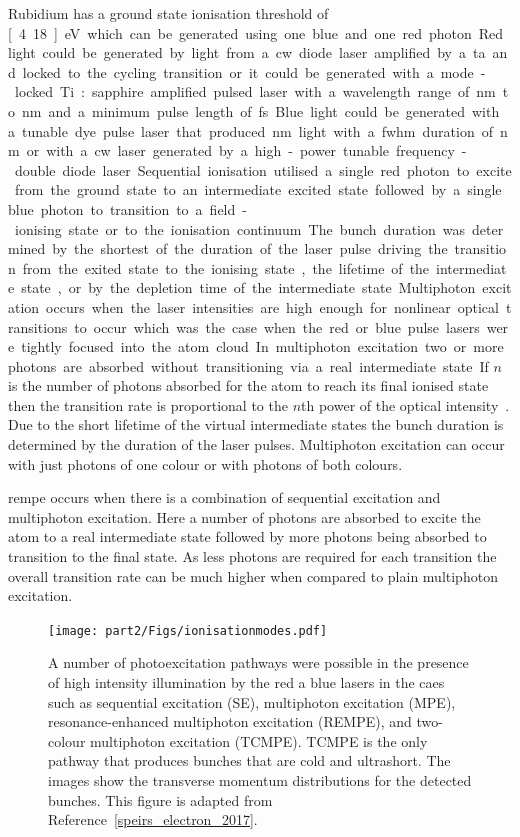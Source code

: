 Rubidium has a ground state ionisation threshold of \unit[4.18]{eV} which can be generated using one blue and one red photon.
Red light could be generated by light from a \gls{cw} diode laser amplified by a \gls{ta} and locked to the cycling transition or it could be generated with a mode-locked Ti:sapphire amplified pulsed laser with a wavelength range of \unit[770]{nm} to \unit[830]{nm} and a minimum pulse length of \unit[35]{fs}.
Blue light could be generated with a tunable dye pulse laser that produced \unit[460 to 490]{nm} light with a \gls{fwhm} duration of \unit[5]{nm} or with a \gls{cw} laser generated by a high-power tunable frequency-double diode laser.

Sequential ionisation utilised a single red photon to excite from the ground state to an intermediate excited state followed by a single blue photon to transition to a field-ionising state or to the ionisation continuum.
The bunch duration was determined by the shortest of the duration of the laser pulse driving the transition from the exited state to the ionising state, the lifetime of the intermediate state, or by the depletion time of the intermediate state.

Multiphoton excitation occurs when the laser intensities are high enough for nonlinear optical transitions to occur which was the case when the red or blue pulse lasers were tightly focused into the atom cloud.
In multiphoton excitation two or more photons are absorbed without transitioning via a real intermediate state.
If $n$ is the number of photons absorbed for the atom to reach its final ionised state then the transition rate is proportional to the $n$th power of the optical intensity~\cite{joachain_atoms_2011}.
Due to the short lifetime of the virtual intermediate states the bunch duration is determined by the duration of the laser pulses.
Multiphoton excitation can occur with just photons of one colour or with photons of both colours.

\Gls{rempe} occurs when there is a combination of sequential excitation and multiphoton excitation.
Here a number of photons are absorbed to excite the atom to a real intermediate state followed by more photons being absorbed to transition to the final state.
As less photons are required for each transition the overall transition rate can be much higher when compared to plain multiphoton excitation.

\begin{figure}
    \center
    \texttt{[image: part2/Figs/ionisationmodes.pdf]}
    \caption[Photoexcitation pathways.]{A number of photoexcitation pathways were possible in the presence of high intensity illumination by the red a blue lasers in the \gls{caes} such as sequential excitation (SE), multiphoton excitation (MPE), resonance-enhanced multiphoton excitation (REMPE), and two-colour multiphoton excitation (TCMPE). TCMPE is the only pathway that produces bunches that are cold and ultrashort. The images show the transverse momentum distributions for the detected bunches.
    This figure is adapted from Reference~\ref{speirs_electron_2017}.}
    \label{figure:ionisation_modes}
\end{figure}

